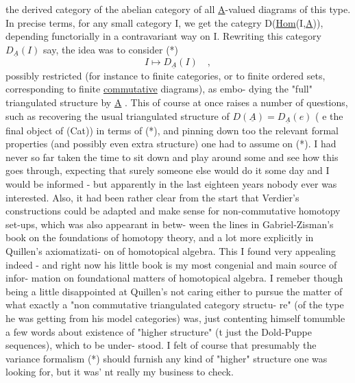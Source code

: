  the derived category of the abelian category of all \underline{A}-valued diagrams
of this type. In precise terms, for any small category I, we get
the categry D(\underline{Hom}(I,\underline{A})), depending functorially in a contravariant
way on I. Rewriting this category $D_{\underline{A}}(I)$ say, the idea was to consider
(*) \[ I \mapsto D_{\underline{A}}(I) \quad , \]
possibly  restricted  (for instance to finite categories, or to finite
ordered sets, corresponding to finite \uline{commutative} diagrams), as embo-%
dying the "full" triangulated structure  by \underline{A} . This of course
at once raises a number of questions, such as recovering the usual
triangulated structure of $D(\underline{A}) = D_{\underline{A}}(e)$ ( e the final object of (Cat))
in terms of (*), and pinning down too the relevant formal properties
(and possibly even extra structure) one had to assume on (*). I had
never so far taken the time to sit down and play around some and see
how this goes through, expecting that surely someone else would do it
some day and I would be informed - but apparently in the last eighteen
years nobody ever was interested. Also, it had been rather clear from
the start that Verdier's constructions could be adapted and  make sense
for non-commutative homotopy set-ups, which was also appearant in betw-%
ween the lines in Gabriel-Zisman's  book on the foundations
of homotopy theory, and a lot more explicitly in Quillen's axiomatizati-%
on of homotopical algebra. This  I found very appealing indeed - and
right now  his little book is my most congenial and main source of infor-%
mation on foundational matters of homotopical algebra. I remeber though
 being a little disappointed at Quillen's not caring either to pursue the
matter of what exactly a "non commutative triangulated category structu-%
re" (of the type he was getting from his model categories) was, just
contenting himself tomumble a few words about existence of "higher
structure" (t just the Dold-Puppe sequences), which   to be under-%
stood. I felt of course that presumably the variance formalism (*) should
furnish any kind of "higher" structure one was looking for, but it was'
nt really my business to check.

